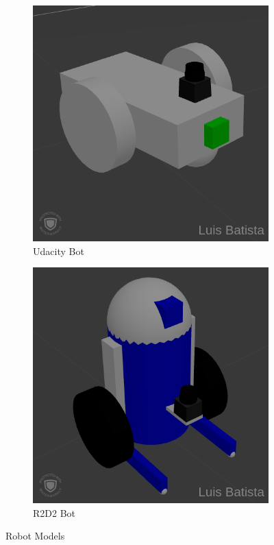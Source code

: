 \documentclass[10pt,journal,compsoc]{IEEEtran}
\begin{document}
\begin{figure}[H]
\centering
\begin{subfigure}{.5\linewidth}
  \centering
  \includegraphics[width=.95\linewidth]{ub_model2.png}
  \caption{Udacity Bot}
  \label{fig:ub-model}
\end{subfigure}%
\begin{subfigure}{.5\linewidth}
  \centering
  \includegraphics[width=.95\linewidth]{r2d2_model2.png}
  \caption{R2D2 Bot}
  \label{fig:r2d2-model}
\end{subfigure}
\caption{Robot Models}
\label{fig:models}
\end{figure}
\end{document}
